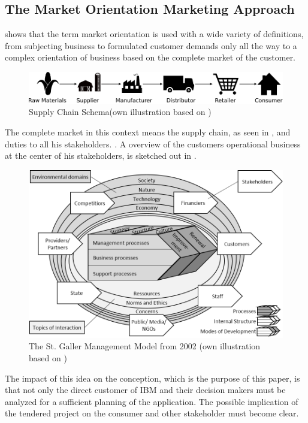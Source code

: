 \subsection{The Market Orientation Marketing Approach}
\textcite[9-10]{Claen.2016} shows that the term market orientation is used with a wide variety of definitions, from subjecting business to formulated customer demands only all the way to a complex orientation of business based on the complete market of the customer.
\begin{figure}[H]
	\includegraphics[width=\textwidth]{img/supplychain.pdf}
	\caption[Supply Chain Schema]{Supply Chain Schema(own illustration based on \protect\cite{SouthwestTech})}
    	\label{fig:supplychain}
\end{figure}
The complete market in this context means the supply chain, as seen in , and duties to all his stakeholders. \parencite[cf.][22-23]{Claen.2016}. A overview of the customers operational business at the center of his stakeholders, is sketched out in .
\begin{figure}[H]
	\includegraphics[width=1\textwidth]{img/SGM.png}
	\caption[St. Galler Management Modell]{The St. Galler Management Model from 2002 (own illustration based on \protect\cite{RueggSturm.2003})}
	\label{fig:SGM}
\end{figure}
The impact of this idea on the conception, which is the purpose of this paper, is that not only the direct customer of IBM and their decision makers must be analyzed for a sufficient planning of the application. The possible implication of the tendered project on the consumer and other stakeholder must become clear.
